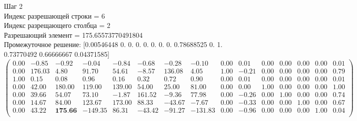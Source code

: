 \documentclass{article}
\begin{document}
\begin{flushleft}
    Шаг 2\\
    Индекс разрешающей строки = 6\\
    Индекс разрещающего столбца = 2\\
    Разрешающий элемент = 175.65573770491804\\
    Промежуточное решение:
    [0.00546448 0.         0.         0.         0.         0.
    0.         0.         0.78688525 0.         1.         0.73770492
    0.66666667 0.04371585]
\begin{equation*}
\begin{pmatrix}
 0.00 &  -0.85 &  -0.92 &   -0.04 &  -0.84 &  -0.68 &  -0.28 &   -0.10 & 0.00 &  0.01 & 0.00 & 0.00 & 0.00 & 0.00 & 0.01 \\
 0.00 & 176.03 &   4.80 &   91.70 &  54.61 &  -8.57 & 136.08 &    4.05 & 1.00 & -0.21 & 0.00 & 0.00 & 0.00 & 0.00 & 0.79 \\
 1.00 &   0.15 &   0.08 &    0.96 &   0.16 &   0.32 &   0.72 &    0.90 & 0.00 &  0.01 & 0.00 & 0.00 & 0.00 & 0.00 & 0.01 \\
 0.00 &  42.00 & 180.00 &  119.00 & 139.00 &  54.00 &  25.00 &   81.00 & 0.00 &  0.00 & 1.00 & 0.00 & 0.00 & 0.00 & 1.00 \\
 0.00 &  39.66 &  54.07 &   73.10 &  -1.87 & 161.52 &  -9.36 &   77.98 & 0.00 & -0.26 & 0.00 & 1.00 & 0.00 & 0.00 & 0.74 \\
 0.00 &  14.67 &  84.00 &  123.67 & 173.00 &  88.33 & -43.67 &   -7.67 & 0.00 & -0.33 & 0.00 & 0.00 & 1.00 & 0.00 & 0.67 \\
 0.00 &  43.22 & \textbf{175.66} & -149.35 &  86.31 & -43.42 & -91.27 & -131.83 & 0.00 & -0.96 & 0.00 & 0.00 & 0.00 & 1.00 & 0.04 \\
\end{pmatrix}
\end{equation*}
\end{flushleft}
\end{document}

